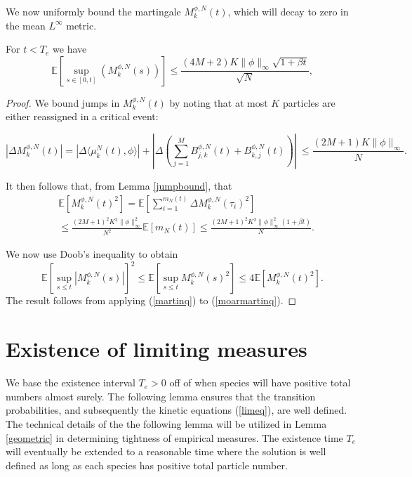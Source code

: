 We now uniformly bound the martingale $M^{\phi,N}_k(t)$, which will decay to zero in the mean $L^\infty$ metric.  
\begin{theorem} For $t<T_e$ we have 
\begin{equation}
\mathbb{E}[\sup_{s \in [0,t]}(M_k^{\phi,N}(s))] \le \frac{(4M+2)K\|\phi\|_\infty\sqrt{1+\beta t}}{\sqrt N},
\end{equation}
\end{theorem}
\begin{proof}

We bound jumps in $M^{\phi,N}_k(t)$ by noting that at most $K$ particles are either reassigned in a critical event: 

\begin{equation}
|\Delta M_k^{\phi,N}(t) |= |\Delta\langle \mu^{N}_k(t),\phi\rangle|+|\Delta (\sum_{j = 1}^M B_{j,k}^{\phi,N}(t)+B_{k,j}^{\phi,N}(t))|\ \le \frac{(2M+1)K\|\phi\|_\infty}N. \end{equation}

It then follows that, from Lemma \ref{jumpbound}, that
\begin{align}\label{martinq}
&\mathbb E[M_k^{\phi,N}(t)^2] = \mathbb{E}\left [\sum_{i = 1}^{m_N(t)}\Delta M_k^{\phi,N}(\tau_i)^2\right ]\\
&\le\frac{(2M+1)^2K^2\|\phi\|^2_\infty}{N^2} \mathbb{E}[m_N(t)]\le \frac{(2M+1)^2K^2\|\phi\|^2_\infty(1+\beta t)}{N}. \nonumber   
\end{align}

 

We now use Doob's inequality to obtain
\begin{equation}\label{moarmartinq}
\mathbb{E}\left[\sup_{s \le t}|M_k^{\phi,N}(s)|\right]^2 \le \mathbb E\left[\sup_{s \le t} M_k^{\phi,N}(s)^2\right] \le 4\mathbb E[M_k^{\phi,N}(t)^2].
\end{equation}
The result follows from applying (\ref{martinq}) to (\ref{moarmartinq}).
\end{proof}

\section{Existence of limiting measures}\label{cogito}

We base the existence interval $T_e>0$ off of when species will have positive total numbers almost surely.  The following lemma ensures that the transition probabilities, and subsequently the kinetic equations (\ref{limeq}), are well defined. The technical details of the the following lemma will be utilized in Lemma \ref{geometric} in determining tightness of empirical measures. The existence time $T_e$ will eventually be extended to a reasonable time where the solution is well defined as long as each species has positive total particle number.    



